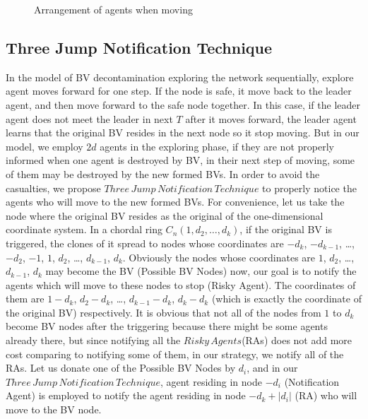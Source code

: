 \documentclass[conference]{IEEEtran}
\begin{document}
\begin{figure}
  \centering 
  \hspace{1in} 
  \caption{Arrangement of agents when moving} 
  \label{fig:subfig1} %
\end{figure}


\subsection{Three Jump Notification Technique}
In the model of BV decontamination exploring the network sequentially, explore agent moves forward for one step. If the node is safe, it move back to the leader agent, and then move forward to the safe node together. In this case, if the leader agent does not meet the leader in next $T$ after it moves forward, the leader agent learns that the original BV resides in the next node so it stop moving. 
But in our model, we employ $2d$ agents in the exploring phase, if they are not properly informed when one agent is destroyed by BV, in their next step of moving, some of them may be destroyed by the new formed BVs. In order to avoid the casualties, we propose $Three\,Jump\,Notification\,Technique$ to properly notice the agents who will move to the new formed BVs.
For convenience, let us take the node where the original BV resides as the original of the one-dimensional coordinate system. In a chordal ring $C_n(1, d_2, \ldots,  d_k)$, if the original BV is triggered, the clones of it spread to nodes whose coordinates are $-d_k$, $-d_{k-1}$, \ldots, $-d_2$, $-1$, $1$, $d_2$, \ldots, $d_{k-1}$, $d_k$. Obviously the nodes whose coordinates are $1$, $d_2$, \dots, $d_{k-1}$, $d_k$ may become the BV (Possible BV Nodes) now, our goal is to notify the agents which will move to these nodes to stop (Risky Agent). The coordinates of them are $1- d_k$, $d_2-d_k$, \ldots, $d_{k-1}-d_k$, $d_k-d_k$ (which is exactly the coordinate of the original BV) respectively. It is obvious that not all of the nodes from $1$ to $d_k$ become BV nodes after the triggering because there might be some agents already there, but since notifying all the $Risky\,Agents$(RAs) does not add more cost comparing to notifying some of them, in our strategy, we notify all of the RAs. Let us donate one of the Possible BV Nodes by $d_i$, and in our $ Three\,Jump\,Notification\,Technique$, agent residing in node $-d_i$ (Notification Agent) is employed to notify the agent residing in node $-d_k+\left |d_i\right |$ (RA) who will move to the BV node. 
\end{document}
